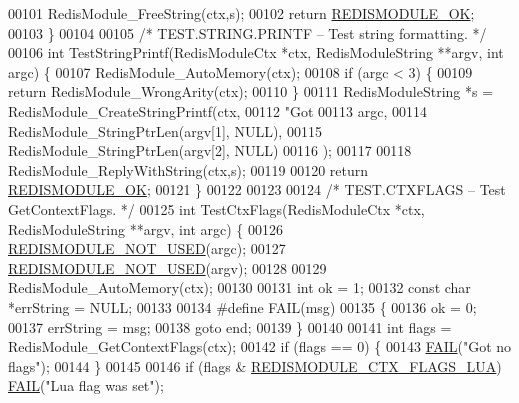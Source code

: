 \begin{DoxyCode}
00101     RedisModule\_FreeString(ctx,s);
00102     \textcolor{keywordflow}{return} \hyperlink{redismodule_8h_a1bc5bfd69abcd378ff52c640adc5418d}{REDISMODULE\_OK};
00103 \}
00104 
00105 \textcolor{comment}{/* TEST.STRING.PRINTF -- Test string formatting. */}
00106 \textcolor{keywordtype}{int} TestStringPrintf(RedisModuleCtx *ctx, RedisModuleString **argv, \textcolor{keywordtype}{int} argc) \{
00107     RedisModule\_AutoMemory(ctx);
00108     \textcolor{keywordflow}{if} (argc < 3) \{
00109         \textcolor{keywordflow}{return} RedisModule\_WrongArity(ctx);
00110     \}
00111     RedisModuleString *s = RedisModule\_CreateStringPrintf(ctx,
00112         \textcolor{stringliteral}{"Got %
00113         argc,
00114         RedisModule\_StringPtrLen(argv[1], NULL),
00115         RedisModule\_StringPtrLen(argv[2], NULL)
00116     );
00117 
00118     RedisModule\_ReplyWithString(ctx,s);
00119 
00120     \textcolor{keywordflow}{return} \hyperlink{redismodule_8h_a1bc5bfd69abcd378ff52c640adc5418d}{REDISMODULE\_OK};
00121 \}
00122 
00123 
00124 \textcolor{comment}{/* TEST.CTXFLAGS -- Test GetContextFlags. */}
00125 \textcolor{keywordtype}{int} TestCtxFlags(RedisModuleCtx *ctx, RedisModuleString **argv, \textcolor{keywordtype}{int} argc) \{
00126     \hyperlink{redismodule_8h_a46d75d81383a00bd6b941af6cadf64c2}{REDISMODULE\_NOT\_USED}(argc);
00127     \hyperlink{redismodule_8h_a46d75d81383a00bd6b941af6cadf64c2}{REDISMODULE\_NOT\_USED}(argv);
00128 
00129     RedisModule\_AutoMemory(ctx);
00130 
00131     \textcolor{keywordtype}{int} ok = 1;
00132     \textcolor{keyword}{const} \textcolor{keywordtype}{char} *errString = NULL;
00133 
00134   \textcolor{preprocessor}{#}\textcolor{preprocessor}{define} \textcolor{preprocessor}{FAIL}\textcolor{preprocessor}{(}\textcolor{preprocessor}{msg}\textcolor{preprocessor}{)}
00135     \textcolor{preprocessor}{\{}
00136       \textcolor{preprocessor}{ok} \textcolor{preprocessor}{=} 0\textcolor{preprocessor}{;}
00137       \textcolor{preprocessor}{errString} \textcolor{preprocessor}{=} \textcolor{preprocessor}{msg}\textcolor{preprocessor}{;}
00138       \textcolor{keywordflow}{goto} \textcolor{preprocessor}{end}\textcolor{preprocessor}{;}
00139     \textcolor{preprocessor}{\}}
00140 
00141     \textcolor{keywordtype}{int} flags = RedisModule\_GetContextFlags(ctx);
00142     \textcolor{keywordflow}{if} (flags == 0) \{
00143       \hyperlink{testmodule_8c_a292ad803e75cf5ca00676b8595513ace}{FAIL}(\textcolor{stringliteral}{"Got no flags"});
00144     \}
00145 
00146     \textcolor{keywordflow}{if} (flags & \hyperlink{redismodule_8h_ae1eac2a152ac7acd3ac8c7eb84d3bc45}{REDISMODULE\_CTX\_FLAGS\_LUA}) \hyperlink{testmodule_8c_a292ad803e75cf5ca00676b8595513ace}{FAIL}(\textcolor{stringliteral}{"Lua flag was set"});
}
\end{DoxyCode}
